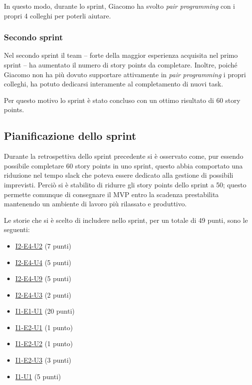 In questo modo, durante lo sprint, Giacomo ha svolto \emph{pair programming} con i propri 4 colleghi per poterli aiutare.

\subsubsection{Secondo sprint}
Nel secondo sprint il team -- forte della maggior esperienza acquisita nel primo sprint -- ha aumentato il numero di story points da completare.
Inoltre, poiché Giacomo non ha più dovuto supportare attivamente in \emph{pair programming} i propri colleghi, ha potuto dedicarsi interamente al completamento di nuovi task.

Per questo motivo lo sprint è stato concluso con un ottimo risultato di 60 story points.

\subsection{Pianificazione dello sprint}
Durante la retrospettiva dello sprint precedente si è osservato come, pur essendo possibile completare 60 story points in uno sprint, questo abbia comportato una riduzione nel tempo slack che poteva essere dedicato alla gestione di possibili imprevisti. Perciò si è stabilito di ridurre gli story points dello sprint a 50; questo permette comunque di consegnare il MVP entro la scadenza prestabilita mantenendo un ambiente di lavoro più rilassato e produttivo.

Le storie che si è scelto di includere nello sprint, per un totale di 49 punti, sono le seguenti:
\begin{itemize}
  \item \hyperref[user-story:i2-e4-u2]{I2-E4-U2} (7 punti)
  \item \hyperref[user-story:i2-e4-u4]{I2-E4-U4} (5 punti)
  \item \hyperref[user-story:i2-e4-u9]{I2-E4-U9} (5 punti)
  \item \hyperref[user-story:i2-e4-u3]{I2-E4-U3} (2 punti)
  \item \hyperref[user-story:i1-e1-u1]{I1-E1-U1} (20 punti)
  \item \hyperref[user-story:i1-e2-u1]{I1-E2-U1} (1 punto)
  \item \hyperref[user-story:i1-e2-u2]{I1-E2-U2} (1 punto)
  \item \hyperref[user-story:i1-e2-u3]{I1-E2-U3} (3 punti)
  \item \hyperref[user-story:i1-u1]{I1-U1} (5 punti)
\end{itemize}

